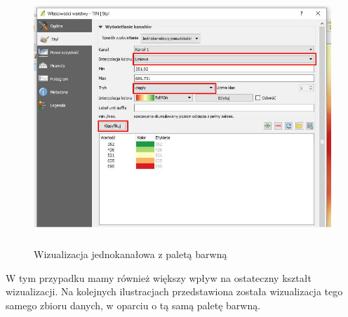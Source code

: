\documentclass[12pt,a4paper]{book}
\begin{document}
\begin{center}
\begin{figure}
\includegraphics[width=13cm,height=9.666cm]{007-raster-pseudo.jpg}
\caption{Wizualizacja jednokanałowa z paletą barwną}
\end{figure}
\end{center}
W tym przypadku mamy również większy wpływ na ostateczny kształt wizualizacji. Na kolejnych ilustracjach przedstawiona została wizualizacja tego samego zbioru danych, w oparciu o tą samą paletę barwną.
\end{document}
